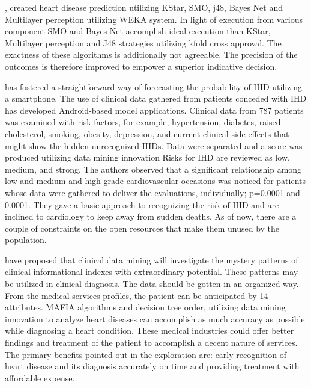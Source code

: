 {\citealp{sultana2016analysis}, created heart disease prediction utilizing KStar, SMO, j48, Bayes Net and Multilayer perception utilizing WEKA system. In light of execution from various component SMO and Bayes Net accomplish ideal execution than KStar, Multilayer perception and J48 strategies utilizing kfold cross approval. The exactness of these algorithms is additionally not agreeable. The precision of the outcomes is therefore improved to empower a superior indicative decision.

\citealp{raihan2016smartphone} has fostered a straightforward way of forecasting the probability of IHD utilizing a smartphone. The use of clinical data gathered from patients conceded with IHD has developed Android-based model applications. Clinical data from 787 patients was examined with risk factors, for example, hypertension, diabetes, raised cholesterol, smoking, obesity, depression, and current clinical side effects that might show the hidden unrecognized  IHDs. Data were separated and a score was produced utilizing data mining innovation Risks for IHD are reviewed as low, medium, and strong. The authors observed that a significant relationship among low-and medium-and high-grade cardiovascular occasions was noticed for patients whose data were gathered to deliver the evaluations, individually; p=0.0001 and 0.0001. They gave a basic approach to recognizing the risk of IHD and are inclined to cardiology to keep away from sudden deaths. As of now, there are a couple of constraints on the open resources that make them unused by the population.

\citealp{babu2017heart} have proposed that clinical data mining will investigate the mystery patterns of clinical informational indexes with extraordinary potential. These patterns may be utilized in clinical diagnosis. The data should be gotten in an organized way. From the medical services profiles, the patient can be anticipated by 14 attributes. MAFIA algorithms and decision tree order, utilizing data mining innovation to analyze heart diseases can accomplish as much accuracy as possible while diagnosing a heart condition. These medical industries could offer better findings and treatment of the patient to accomplish a decent nature of services. The primary benefits pointed out in the exploration are: early recognition of heart disease and its diagnosis accurately on time and providing treatment with affordable expense.

}
